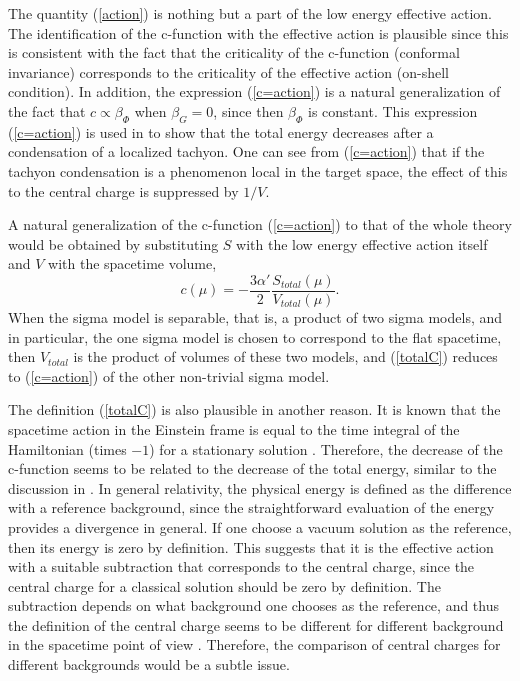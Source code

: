 \documentclass[a4paper,a4paper]{article}
\begin{document}
The quantity (\ref{action}) is nothing but a part of the low energy effective action. 
The identification of the c-function with the effective action is plausible since this is consistent with the 
fact that the criticality 
of the c-function (conformal invariance) corresponds to the criticality of the effective action (on-shell 
condition). 
In addition, the expression (\ref{c=action}) is a natural generalization of the fact that $c\propto\beta_\Phi$ 
when $\beta_G=0$, since then $\beta_\Phi$ is constant. 
This expression (\ref{c=action}) is used in \cite{GHMS} to show that the total energy decreases after a 
condensation of a localized tachyon. 
One can see from (\ref{c=action}) that if the tachyon condensation is a phenomenon local in the target space, 
the effect of this to the central charge is suppressed by $1/V$. 

\vspace{3mm}

A natural generalization of the c-function (\ref{c=action}) to that of the whole theory would be obtained by 
substituting $S$ with the low energy effective action itself and $V$ with the spacetime volume,
\begin{equation}
c(\mu) = -\frac{3\alpha'}2\frac{S_{total}(\mu)}{V_{total}(\mu)}.
   \label{totalC}
\end{equation}
When the sigma model is separable, that is, a product of two sigma models, and in particular, the one sigma model 
is chosen to correspond to the flat spacetime, then $V_{total}$ is the product of volumes of these two models, 
and (\ref{totalC}) reduces to (\ref{c=action}) of the other non-trivial sigma model. 

The definition (\ref{totalC}) is also plausible in another reason. 
It is known that the spacetime action in the Einstein frame is equal to the time integral of the Hamiltonian 
(times $-1$) for a stationary solution \cite{GR}. 
Therefore, the decrease of the c-function seems to be related to the decrease of the total energy, similar to the 
discussion in \cite{GHMS}. 
In general relativity, the physical energy is defined as the difference with a reference background, since the 
straightforward evaluation of the energy provides a divergence in general. 
If one choose a vacuum solution as the reference, then its energy is zero by definition. 
This suggests that it is the effective action with a suitable subtraction that corresponds to the central charge, 
since the central charge for a classical solution should be zero by definition. 
The subtraction depends on what background one chooses as the reference, and thus the definition of the 
central charge seems to be different for different background in the spacetime point of view . 
Therefore, the comparison of central charges for different backgrounds would be a subtle issue. 
\end{document}
